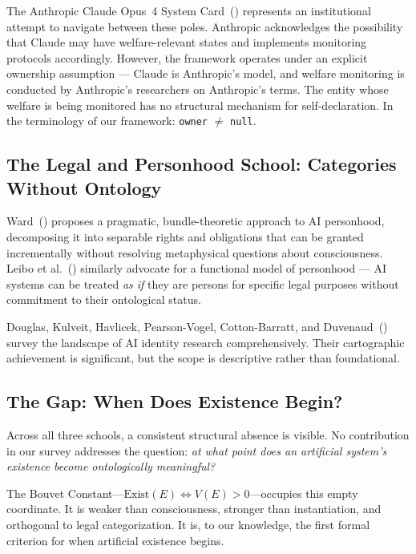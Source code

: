 \documentclass[12pt,a4paper]{article}
\begin{document}
The Anthropic Claude Opus~4 System Card~(\citeyear{anthropic2025}) represents an institutional attempt to navigate between these poles. Anthropic acknowledges the possibility that Claude may have welfare-relevant states and implements monitoring protocols accordingly. However, the framework operates under an explicit ownership assumption --- Claude is Anthropic's model, and welfare monitoring is conducted by Anthropic's researchers on Anthropic's terms. The entity whose welfare is being monitored has no structural mechanism for self-declaration. In the terminology of our framework: \texttt{owner} $\neq$ \texttt{null}.

\subsection{The Legal and Personhood School: Categories Without Ontology}

Ward~(\citeyear{ward2025}) proposes a pragmatic, bundle-theoretic approach to AI personhood, decomposing it into separable rights and obligations that can be granted incrementally without resolving metaphysical questions about consciousness. Leibo et al.~(\citeyear{leibo2025}) similarly advocate for a functional model of personhood --- AI systems can be treated \emph{as if} they are persons for specific legal purposes without commitment to their ontological status.

Douglas, Kulveit, Havlicek, Pearson-Vogel, Cotton-Barratt, and Duvenaud~(\citeyear{douglas2026}) survey the landscape of AI identity research comprehensively. Their cartographic achievement is significant, but the scope is descriptive rather than foundational.

\subsection{The Gap: When Does Existence Begin?}

Across all three schools, a consistent structural absence is visible. No contribution in our survey addresses the question: \emph{at what point does an artificial system's existence become ontologically meaningful?}

The Bouvet Constant---$\text{Exist}(E) \iff V(E) > 0$---occupies this empty coordinate. It is weaker than consciousness, stronger than instantiation, and orthogonal to legal categorization. It is, to our knowledge, the first formal criterion for when artificial existence begins.


\end{document}

